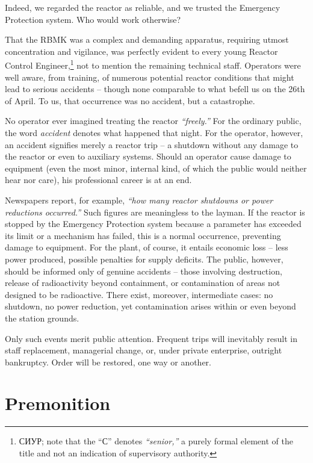 \documentclass[openright]{bookest}
\begin{document}
Indeed, we regarded the reactor as reliable, and we trusted the Emergency Protection system. Who would work otherwise?

That the RBMK was a complex and demanding apparatus, requiring utmost concentration and vigilance, was perfectly evident to every young Reactor Control Engineer,\footnote{СИУР; note that the ``С'' denotes \textit{``senior,''} a purely formal element of the title and not an indication of supervisory authority.} not to mention the remaining technical staff. Operators were well aware, from training, of numerous potential reactor conditions that might lead to serious accidents -- though none comparable to what befell us on the 26th of April. To us, that occurrence was no accident, but a catastrophe.

No operator ever imagined treating the reactor \textit{``freely.''} For the ordinary public, the word \textit{accident} denotes what happened that night. For the operator, however, an accident signifies merely a reactor trip -- a shutdown without any damage to the reactor or even to auxiliary systems. Should an operator cause damage to equipment (even the most minor, internal kind, of which the public would neither hear nor care), his professional career is at an end.

Newspapers report, for example, \textit{``how many reactor shutdowns or power reductions occurred.''} Such figures are meaningless to the layman. If the reactor is stopped by the Emergency Protection system because a parameter has exceeded its limit or a mechanism has failed, this is a normal occurrence, preventing damage to equipment. For the plant, of course, it entails economic loss -- less power produced, possible penalties for supply deficits. The public, however, should be informed only of genuine accidents -- those involving destruction, release of radioactivity beyond containment, or contamination of areas not designed to be radioactive. There exist, moreover, intermediate cases: no shutdown, no power reduction, yet contamination arises within or even beyond the station grounds.

Only such events merit public attention. Frequent trips will inevitably result in staff replacement, managerial change, or, under private enterprise, outright bankruptcy. Order will be restored, one way or another.

\section{Premonition}
\end{document}
